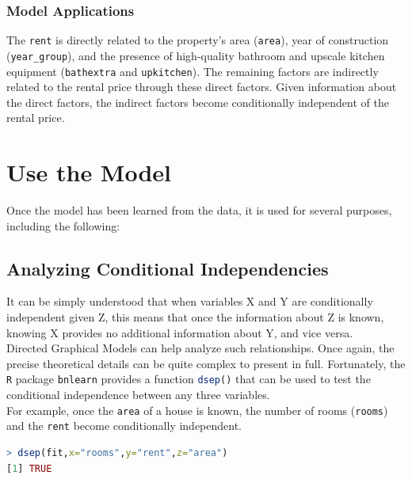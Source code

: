 \documentclass[15pt,a4paper]{report}
\begin{document}
\subsubsection*{Model Applications}
 The \lstinline[language=R]|rent| is directly related to the property's area (\lstinline[language=R]|area|), year of construction (\lstinline[language=R]|year_group|), and the presence of high-quality bathroom and upscale kitchen equipment (\lstinline[language=R]|bathextra| and \lstinline[language=R]|upkitchen|). The remaining factors are indirectly related to the rental price through these direct factors. Given information about the direct factors, the indirect factors become conditionally independent of the rental price.
\section*{Use the Model}
Once the model has been learned from the data, it is used for several purposes, including the following:
\subsection*{Analyzing Conditional Independencies}
It can be simply understood that when variables X and Y are conditionally independent given Z, this means that once the information about Z is known, knowing X provides no additional information about Y, and vice versa.\\

Directed Graphical Models can help analyze such relationships. Once again, the precise theoretical details can be quite complex to present in full. Fortunately, the \lstinline[language=R]|R| package \lstinline[language=R]|bnlearn| provides a function \lstinline[language=R]|dsep()| that can be used to test the conditional independence between any three variables. \\

For example, once the \lstinline[language=R]|area| of a house is known, the number of rooms (\lstinline[language=R]|rooms|) and the \lstinline[language=R]|rent| become conditionally independent.

\begin{lstlisting}[language=R]
> dsep(fit,x="rooms",y="rent",z="area")
[1] TRUE
\end{lstlisting}
\end{document}
